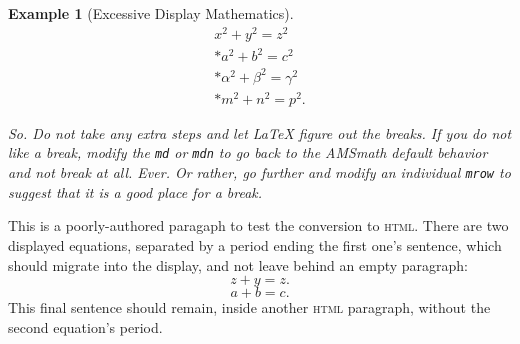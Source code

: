 \documentclass[pdflatex]{sn-jnl}
\theoremstyle{thmstyleone}%
\theoremstyle{thmstyletwo}%
\newtheorem{example}[theorem]{Example}
\theoremstyle{thmstylethree}%
\newcommand{\mono}[1]{\texttt{#1}}
\newcommand{\initialism}[1]{\textsc{\MakeLowercase{#1}}}
\numberwithin{equation}{section}
\begin{document}
\begin{example}[Excessive Display Mathematics]
\begin{gather}
x^2+y^2=z^2\label{section-mathematics-4-10-3-2-45}\\*
a^2+b^2=c^2\label{section-mathematics-4-10-3-2-46}\\*
\alpha^2+\beta^2=\gamma^2\label{section-mathematics-4-10-3-2-47}\\*
m^2+n^2=p^2\text{.}\label{section-mathematics-4-10-3-2-48}
\end{gather}
%
\par
So.  Do not take any extra steps and let \LaTeX{} figure out the breaks.  If you do not like a break, modify the \mono{md} or \mono{mdn} to go back to the AMSmath default behavior and not break at all.  Ever.  Or rather, go further and modify an individual \mono{mrow} to suggest that it is a good place for a break.%
\end{example}
This is a poorly-authored paragaph to test the conversion to \initialism{HTML}.  There are two displayed equations, separated by a period ending the first one's sentence, which should migrate into the display, and not leave behind an empty paragraph:%
\begin{equation*}
z+y = z\text{.}
\end{equation*}
%
\begin{equation*}
a + b = c\text{.}
\end{equation*}
This final sentence should remain, inside another \initialism{HTML} paragraph, without the second equation's period.%
%
%
\typeout{************************************************}
\typeout{************************************************}
%
\end{document}
